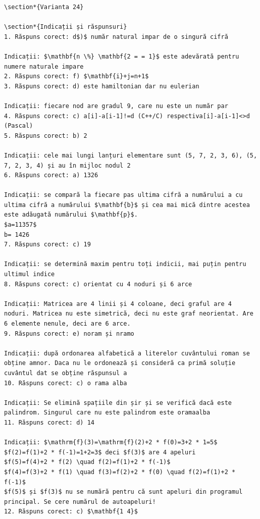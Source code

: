 \documentclass[10pt]{article}
\begin{document}
\begin{verbatim}
\section*{Varianta 24}

\section*{Indicații și răspunsuri}
1. Răspuns corect: d$)$ număr natural impar de o singură cifră

Indicații: $\mathbf{n \%} \mathbf{2 = = 1}$ este adevărată pentru numere naturale impare
2. Răspuns corect: f) $\mathbf{i}+j=n+1$
3. Răspuns corect: d) este hamiltonian dar nu eulerian

Indicații: fiecare nod are gradul 9, care nu este un număr par
4. Răspuns corect: c) a[i]-a[i-1]!=d (C++/C) respectiva[i]-a[i-1]<>d (Pascal)
5. Răspuns corect: b) 2

Indicații: cele mai lungi lanțuri elementare sunt (5, 7, 2, 3, 6), (5, 7, 2, 3, 4) și au în mijloc nodul 2
6. Răspuns corect: a) 1326

Indicații: se compară la fiecare pas ultima cifră a numărului a cu ultima cifră a numărului $\mathbf{b}$ și cea mai mică dintre acestea este adăugată numărului $\mathbf{p}$.
$a=11357$
b= 1426
7. Răspuns corect: c) 19

Indicații: se determină maxim pentru toți indicii, mai puțin pentru ultimul indice
8. Răspuns corect: c) orientat cu 4 noduri și 6 arce

Indicații: Matricea are 4 linii și 4 coloane, deci graful are 4 noduri. Matricea nu este simetrică, deci nu este graf neorientat. Are 6 elemente nenule, deci are 6 arce.
9. Răspuns corect: e) noram și nramo

Indicații: după ordonarea alfabetică a literelor cuvântului roman se obține amnor. Daca nu le ordonează și consideră ca primă soluție cuvântul dat se obține răspunsul a
10. Răspuns corect: c) o rama alba

Indicații: Se elimină spațiile din șir și se verifică dacă este palindrom. Singurul care nu este palindrom este oramaalba
11. Răspuns corect: d) 14

Indicații: $\mathrm{f}(3)=\mathrm{f}(2)+2 * f(0)=3+2 * 1=5$
$f(2)=f(1)+2 * f(-1)=1+2=3$ deci $f(3)$ are 4 apeluri
$f(5)=f(4)+2 * f(2) \quad f(2)=f(1)+2 * f(-1)$
$f(4)=f(3)+2 * f(1) \quad f(3)=f(2)+2 * f(0) \quad f(2)=f(1)+2 * f(-1)$
$f(5)$ și $f(3)$ nu se numără pentru că sunt apeluri din programul principal. Se cere numărul de autoapeluri!
12. Răspuns corect: c) $\mathbf{1 4}$


\end{verbatim}
\end{document}
